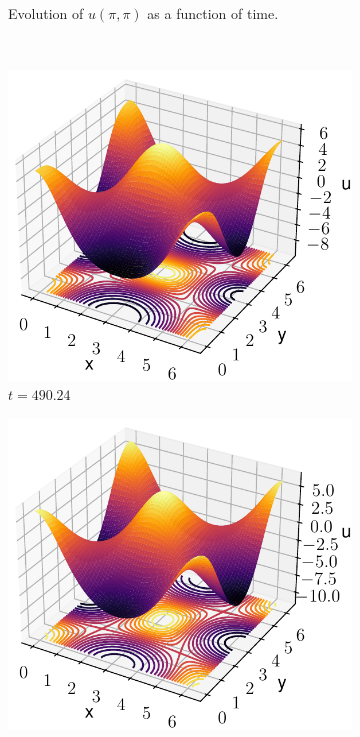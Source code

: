 \documentclass[twoside]{article}
\begin{document}
\begin{figure}
\begin{subfigure}[ht]{0.32\textwidth}
    \caption{Evolution of $u(\pi,\pi)$ as a function of time.}
  \end{subfigure}\\
  \begin{subfigure}[ht]{0.24\textwidth}
    \includegraphics[width=\textwidth]{images/slice_nu1_0.35_nu2_0.3_time_490.24.pdf}
    \caption{$t=490.24$}
  \end{subfigure}\hfill
  \begin{subfigure}[ht]{0.24\textwidth}
    \includegraphics[width=\textwidth]{images/slice_nu1_0.35_nu2_0.3_time_491.7.pdf}

\end{subfigure}
\end{figure}
\end{document}
